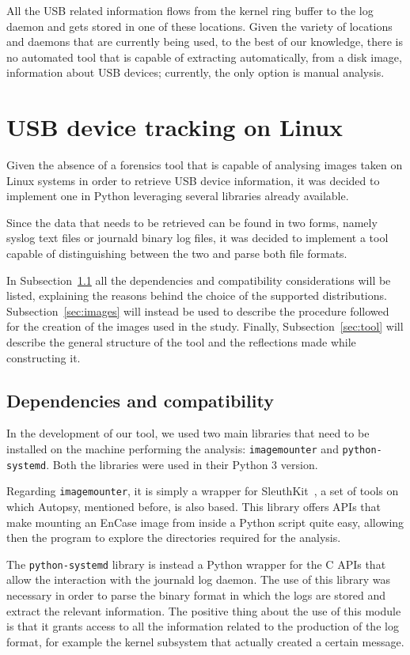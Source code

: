\documentclass[a4paper]{article}
\begin{document}
All the USB related information flows from the kernel ring buffer to the log
daemon and gets stored in one of these locations. Given the variety of locations
and daemons that are currently being used, to the best of our knowledge, there
is no automated tool that is capable of extracting automatically, from a disk
image, information about USB devices; currently, the only option is manual
analysis.

\section{USB device tracking on Linux}
\label{sec:contrib}
Given the absence of a forensics tool that is capable of analysing images taken
on Linux systems in order to retrieve USB device information, it was decided to
implement one in Python leveraging several libraries already available.

Since the data that needs to be retrieved can be found in two forms, namely
syslog text files or journald binary log files, it was decided to implement a
tool capable of distinguishing between the two and parse both file formats.

In Subsection~\ref{sec:prems} all the dependencies and compatibility
considerations will be listed, explaining the reasons behind the choice of the
supported distributions. Subsection~\ref{sec:images} will instead be used to
describe the procedure followed for the creation of the images used in the
study. Finally, Subsection~\ref{sec:tool} will describe the general structure of
the tool and the reflections made while constructing it.

\subsection{Dependencies and compatibility}
\label{sec:prems}
In the development of our tool, we used two main libraries that need
to be installed on the machine performing the analysis:
\texttt{imagemounter} and \texttt{python-systemd}. Both the libraries were used
in their Python 3 version.

Regarding \texttt{imagemounter}, it is simply a wrapper for
SleuthKit~\cite{sleuthkit}, a set of tools on which Autopsy, mentioned before,
is also based.  This library offers APIs that make mounting an EnCase image from
inside a Python script quite easy, allowing then the program to explore the
directories required for the analysis.

The \texttt{python-systemd} library is instead a Python wrapper for the C APIs
that allow the interaction with the journald log daemon. The use of this library
was necessary in order to parse the binary format in which the logs are stored
and extract the relevant information. The positive thing about the use of this
module is that it grants access to all the information related to the production
of the log format, for example the kernel subsystem that actually created a
certain message.
\end{document}
